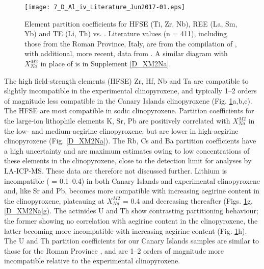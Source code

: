 \documentclass[review,authoryear,12pt]{elsarticle}
\begin{document}
        \begin{figure}[htp]
        \begin{center}
        \texttt{[image: 7\_D\_Al\_iv\_Literature\_Jun2017-01.eps]}
        \caption[Selected trace-element-partition coefficients vs. ]{Element partition coefficients for HFSE (Ti, Zr, Nb), REE (La, Sm, Yb) and TE (Li, Th) vs. . Literature values (n = 411), including those from the Roman Province, Italy, are from the compilation of \citet{Bedard2014}, with additional, more recent, data from \citet{Mollo2016}. A similar diagram with $X^{M2}_{Na}$ in place of  is in Supplement \ref{D_XM2Na}.}
        \label{7_Al_iv}
        \end{center}
        \end{figure}
The high field-strength elements (HFSE) Zr, Hf, Nb and Ta are compatible to slightly incompatible in the experimental clinopyroxene, and typically 1--2 orders of magnitude less compatible in the Canary Islands clinopyroxene (Fig. \ref{7_Al_iv}a,b,c). The HFSE are most compatible in sodic clinopyroxene.
	Partition coefficients for the large-ion lithophile elements K, Sr, Pb are positively correlated with $X_{Na}^{M2}$ in the low- and medium-aegirine clinopyroxene, but are lower in high-aegirine clinopyroxene (Fig. \ref{D_XM2Na}). The Rb, Cs and Ba partition coefficients have a high uncertainty and are maximum estimates owing to low concentrations of these elements in the clinopyroxene, close to the detection limit for analyses by LA-ICP-MS. These data are therefore not discussed further. 
	Lithium is incompatible ( = 0.1--0.4) in both Canary Islands and experimental clinopyroxene and, like Sr and Pb, becomes more compatible with increasing aegirine content in the clinopyroxene, plateauing at $X_{Na}^{M2}$ = 0.4 and decreasing thereafter (Figs. \ref{7_Al_iv}g, \ref{D_XM2Na}g). 
	The actinides U and Th show contrasting partitioning behaviour; the former showing no correlation with aegirine content in the clinopyroxene, the latter becoming more incompatible with increasing aegirine content (Fig. \ref{7_Al_iv}h). The U and Th partition coefficients for our Canary Islands samples are similar to those for the Roman Province \citep{Wood2001cpx, Fedele2009, Mollo2013, Mollo2016}, and are 1--2 orders of magnitude more incompatible relative to the experimental clinopyroxene.
\end{document}
